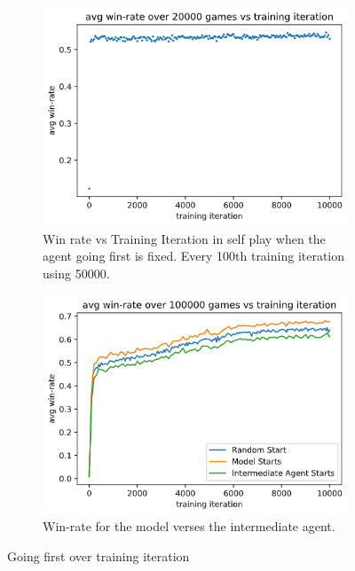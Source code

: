 \documentclass[../main.tex]{subfiles}
\begin{document}
\begin{figure}
    \centering
    \begin{subfigure}[t]{0.49\textwidth}
        \centering
        \includegraphics[width=\textwidth,keepaspectratio]{images/results/going_first_over_time.png}
        \caption{Win rate vs Training Iteration in self play when the agent going first is fixed. Every 100th training iteration using 50000.}
        \label{fig:win-rate-going-first}
    \end{subfigure}
    \hfill
    \begin{subfigure}[t]{0.49\textwidth}
        \centering
        \includegraphics[width=\textwidth,keepaspectratio]{images/results/winrate_vs_int_going_first.png}
        \caption{Win-rate for the model verses the intermediate agent. }
        \label{fig:win-rate-vs-int-going-first}
    \end{subfigure}
    \caption{Going first over training iteration}
    \label{fig:going-first-over-time}
\end{figure}
\end{document}
